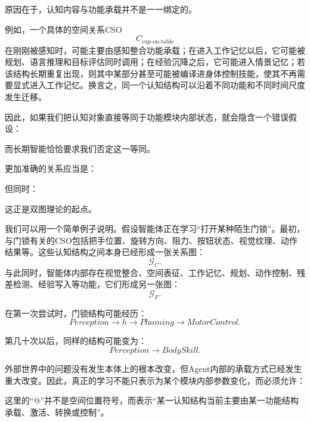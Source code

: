 原因在于，认知内容与功能承载并不是一一绑定的。

例如，一个具体的空间关系CSO
\[
C_{\text{cup-on-table}}
\]
在刚刚被感知时，可能主要由感知整合功能承载；在进入工作记忆以后，它可能被规划、语言推理和目标评估同时调用；在经验沉降之后，它可能进入情景记忆；若该结构长期重复出现，则其中某部分甚至可能被编译进身体控制技能，使其不再需要显式进入工作记忆。换言之，同一个认知结构可以沿着不同功能和不同时间尺度发生迁移。

因此，如果我们把认知对象直接等同于功能模块内部状态，就会隐含一个错误假设：
\begin{statementbox}
\centering
{}
\end{statementbox}
而长期智能恰恰要求我们否定这一等同。

更加准确的关系应当是：
\begin{statementbox}
\centering
{}
\end{statementbox}
但同时：
\begin{statementbox}
\centering
{}
\end{statementbox}

这正是双图理论的起点。

我们可以用一个简单例子说明。假设智能体正在学习“打开某种陌生门锁”。最初，与门锁有关的CSO包括把手位置、旋转方向、阻力、按钮状态、视觉纹理、动作结果等。这些认知结构之间本身已经形成一张关系图：
\[
\mathcal G_C.
\]
与此同时，智能体内部存在视觉整合、空间表征、工作记忆、规划、动作控制、残差检测、经验写入等功能，它们形成另一张图：
\[
\mathcal G_F.
\]

在第一次尝试时，门锁结构可能经历：
\[
Perception
\rightarrow
h
\rightarrow
Planning
\rightarrow
MotorControl.
\]

第几十次以后，同样的结构可能变为：
\[
Perception
\rightarrow
BodySkill.
\]

外部世界中的问题没有发生本体上的根本改变，但Agent内部的承载方式已经发生重大改变。因此，真正的学习不能只表示为某个模块内部参数变化，而必须允许：
\begin{statementbox}
\centering
{}
\end{statementbox}

这里的“@”并不是空间位置符号，而表示“某一认知结构当前主要由某一功能结构承载、激活、转换或控制”。

